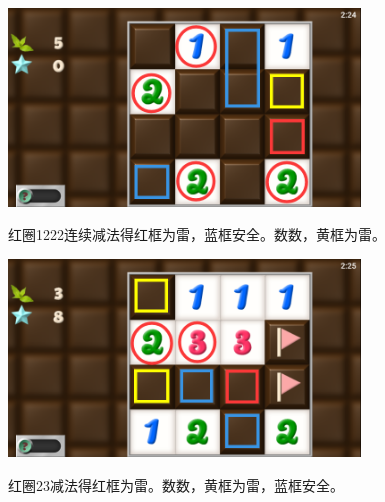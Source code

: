 \subsection{} %
\begin{center}
    \includegraphics[width=0.7\textwidth]{puzzle/146-1.png}
\end{center}
红圈1222连续减法得红框为雷，蓝框安全。数数，黄框为雷。
\begin{center}
    \includegraphics[width=0.7\textwidth]{puzzle/146-2.png}
\end{center}
红圈23减法得红框为雷。数数，黄框为雷，蓝框安全。

